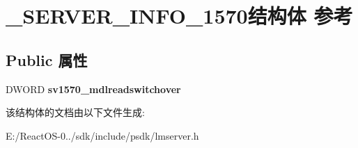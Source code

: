 \hypertarget{struct___s_e_r_v_e_r___i_n_f_o__1570}{}\section{\+\_\+\+S\+E\+R\+V\+E\+R\+\_\+\+I\+N\+F\+O\+\_\+1570结构体 参考}
\label{struct___s_e_r_v_e_r___i_n_f_o__1570}
\subsection*{Public 属性}
\begin{DoxyCompactItemize}
\item 
\mbox{\label{struct___s_e_r_v_e_r___i_n_f_o__1570_aff6764633889805ad692f451b8c547d0}} 
D\+W\+O\+RD {\bfseries sv1570\+\_\+mdlreadswitchover}
\end{DoxyCompactItemize}


该结构体的文档由以下文件生成\+:\begin{DoxyCompactItemize}
\item 
E\+:/\+React\+O\+S-\/0../sdk/include/psdk/lmserver.\+h\end{DoxyCompactItemize}

